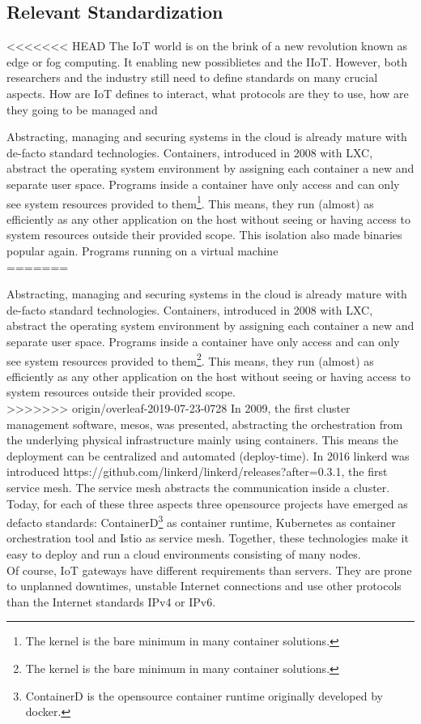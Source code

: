 \subsection{Relevant Standardization}
<<<<<<< HEAD
The IoT world is on the brink of a new revolution known as edge or fog computing. It  enabling new possiblietes and the IIoT. However, both researchers and the industry still need to define standards on many crucial aspects. How are IoT defines to interact, what protocols are they to use, how are they going to be managed and 

Abstracting, managing and securing systems in the cloud is already mature with de-facto standard technologies. Containers, introduced in 2008 with LXC, abstract the operating system environment by assigning each container a new and separate user space. Programs inside a container have only access and can only see system resources provided to them\footnote{The kernel is the bare minimum in many container solutions.}. This means, they run (almost) as efficiently as any other application on the host without seeing or having access to system resources outside their provided scope. This isolation also made binaries popular again. Programs running on a virtual machine\\
=======
\

Abstracting, managing and securing systems in the cloud is already mature with de-facto standard technologies. Containers, introduced in 2008 with LXC, abstract the operating system environment by assigning each container a new and separate user space. Programs inside a container have only access and can only see system resources provided to them\footnote{The kernel is the bare minimum in many container solutions.}. This means, they run (almost) as efficiently as any other application on the host without seeing or having access to system resources outside their provided scope.\\
>>>>>>> origin/overleaf-2019-07-23-0728
In 2009, the first cluster management software, mesos, was presented, abstracting the orchestration from the underlying physical infrastructure mainly using containers. This means the deployment can be centralized and automated (deploy-time). In 2016 linkerd was introduced https://github.com/linkerd/linkerd/releases?after=0.3.1, the first service mesh. The service mesh abstracts the communication inside a cluster. Today, for each of these three aspects three opensource projects have emerged as defacto standards: ContainerD\footnote{ContainerD is the opensource container runtime originally developed by docker.} as container runtime, Kubernetes as container orchestration tool and Istio as service mesh. Together, these technologies make it easy to deploy and run a cloud environments consisting of many nodes.\\
Of course, IoT gateways have different requirements than servers. They are prone to unplanned downtimes, unstable Internet connections and use other protocols than the Internet standards IPv4 or IPv6. 